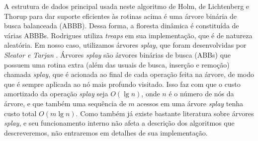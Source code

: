 A estrutura de dados principal usada neste algoritmo de Holm, de Lichtenberg e Thorup para dar suporte eficientes às rotinas acima é uma árvore binária de busca balanceada (ABBB). Dessa forma, a floresta dinâmica é constituída de várias ABBBs. Rodrigues utiliza \textit{treaps} em sua implementação, que é de natureza aleatória. Em nosso caso, utilizamos árvores \textit{splay}, que foram desenvolvidas por \textit{Sleator e Tarjan} \cite{sleator}. Árvores \textit{splay} são árvores binárias de busca (ABBs) que possuem uma rotina extra (além das usuais de busca, inserção e remoção) chamada \textit{splay}, que é acionada ao final de cada operação feita na árvore, de modo que é sempre aplicada ao nó mais profundo visitado. Isso faz com que o custo amortizado da operação \textit{splay} seja $O(\lg n)$, onde $n$ é o número de nós da árvore, e que também uma sequência de $m$ acessos em uma árvore \textit{splay} tenha custo total $O(m \lg n)$.  Como também já existe bastante literatura sobre árvores \textit{splay}, e seu funcionamento interno não afeta a descrição dos algoritmos que descreveremos, não entraremos em detalhes de sua implementação.
